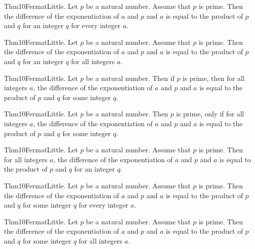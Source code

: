 \documentclass{article}
\begin{document}
Thm10FermatLittle. Let $p$ be a natural number. Assume that $p$ is prime. Then the difference of the exponentiation of $a$ and $p$ and $a$ is equal to the product of $p$ and $q$ for an integer $q$ for every integer $a$.

Thm10FermatLittle. Let $p$ be a natural number. Assume that $p$ is prime. Then the difference of the exponentiation of $a$ and $p$ and $a$ is equal to the product of $p$ and $q$ for an integer $q$ for all integers $a$.

Thm10FermatLittle. Let $p$ be a natural number. Then if $p$ is prime, then for all integers $a$, the difference of the exponentiation of $a$ and $p$ and $a$ is equal to the product of $p$ and $q$ for some integer $q$.

Thm10FermatLittle. Let $p$ be a natural number. Then $p$ is prime, only if for all integers $a$, the difference of the exponentiation of $a$ and $p$ and $a$ is equal to the product of $p$ and $q$ for some integer $q$.

Thm10FermatLittle. Let $p$ be a natural number. Assume that $p$ is prime. Then for all integers $a$, the difference of the exponentiation of $a$ and $p$ and $a$ is equal to the product of $p$ and $q$ for an integer $q$.

Thm10FermatLittle. Let $p$ be a natural number. Assume that $p$ is prime. Then the difference of the exponentiation of $a$ and $p$ and $a$ is equal to the product of $p$ and $q$ for some integer $q$ for every integer $a$.

Thm10FermatLittle. Let $p$ be a natural number. Assume that $p$ is prime. Then the difference of the exponentiation of $a$ and $p$ and $a$ is equal to the product of $p$ and $q$ for some integer $q$ for all integers $a$.
\end{document}

